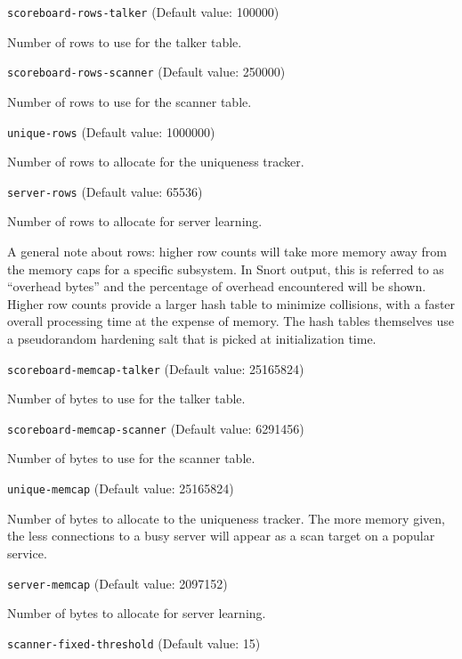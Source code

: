 \documentclass[english]{report}
\newcounter{slistnum}
\newenvironment{slist}
{ \begin{list}{ {\bf \arabic{slistnum}.} }{\usecounter{slistnum} } }
{ \end{list} }
\begin{document}
\begin{slist}
\item \texttt{scoreboard-rows-talker} (Default value: 100000)

Number of rows to use for the talker table. 

\item \texttt{scoreboard-rows-scanner} (Default value: 250000)

Number of rows to use for the scanner table. 

\item \texttt{unique-rows} (Default value: 1000000)

Number of rows to allocate for the uniqueness tracker.   

\item \texttt{server-rows} (Default value: 65536)

Number of rows to allocate for server learning. 

A general note about rows: higher row counts will take more memory away
from the memory caps for a specific subsystem.  In Snort output,
this is referred to as ``overhead bytes'' and the percentage of overhead
encountered will be shown.  Higher row counts provide a larger hash
table to minimize collisions, with a faster overall processing time
at the expense of memory.  The hash tables themselves use a pseudorandom
hardening salt that is picked at initialization time.

\item \texttt{scoreboard-memcap-talker} (Default value: 25165824)

Number of bytes to use for the talker table. 
 
\item \texttt{scoreboard-memcap-scanner} (Default value: 6291456)

Number of bytes to use for the scanner table. 

\item \texttt{unique-memcap} (Default value: 25165824)

Number of bytes to allocate to the uniqueness tracker. The more memory given,
the less connections to a busy server will appear as a scan target on a
popular service. 

\item \texttt{server-memcap} (Default value: 2097152)

Number of bytes to allocate for server learning. 

\item \texttt{scanner-fixed-threshold} (Default value: 15)


\end{slist}
\end{document}
